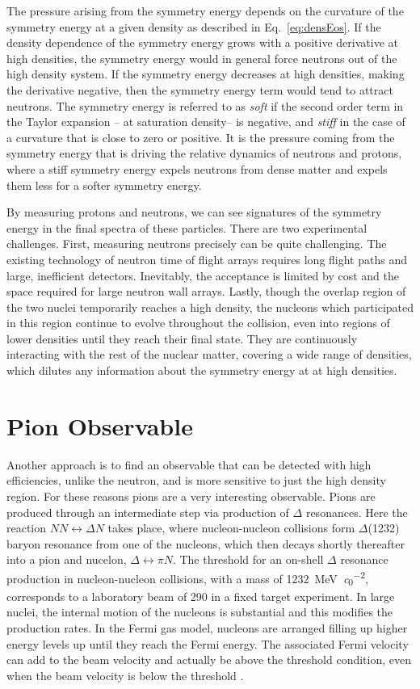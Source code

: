The pressure arising from the symmetry energy depends on the curvature of the symmetry energy at a given density as described in Eq.~\ref{eq:densEos}. If the density dependence of the symmetry energy grows with a positive derivative at high densities, the symmetry energy would in general force neutrons out of the high density system. If the symmetry energy decreases at high densities, making the derivative  negative, then the symmetry energy term would tend to attract neutrons. The symmetry energy is referred to as \emph{soft} if the second order term in the Taylor expansion -- at saturation density-- is negative, and \emph{stiff} in the case of a curvature that is close to zero or positive. It is the pressure coming from the symmetry energy that is driving the relative dynamics of neutrons and protons, where a stiff symmetry energy expels neutrons from dense matter and expels them less for a softer symmetry energy.

By measuring protons and neutrons, we can see signatures of the symmetry energy in the final spectra of these particles. There are two experimental challenges. First,  measuring neutrons precisely can be quite challenging. The existing technology of neutron time of flight arrays requires long flight paths and large, inefficient detectors. Inevitably, the acceptance is limited by cost and the space required for large neutron wall arrays. Lastly, though the overlap region of the two nuclei temporarily reaches a high density, the nucleons which participated in this region continue to evolve throughout the collision, even into regions of lower densities until they reach their final state. They are continuously interacting with the rest of the nuclear matter, covering a wide range of densities, which dilutes any information about the symmetry energy at at high densities.  




\section{Pion Observable}
\label{sec:pionObs}
Another approach is to find an observable that can be detected with high efficiencies, unlike the neutron, and is more sensitive to just the high density region. For these reasons pions are a very interesting observable. Pions are produced through an intermediate step via production of $\Delta$ resonances. Here the reaction $ NN \leftrightarrow \Delta N$ takes place, where nucleon-nucleon collisions form $\Delta$(1232) baryon resonance from one of the nucleons, which then decays shortly thereafter into a pion and nucelon, $\Delta \leftrightarrow \pi N$. The threshold for  an on-shell $\Delta$ resonance production in nucleon-nucleon collisions, with a mass of \SI{1232}{\mega\electronvolt\per\clight\squared}, corresponds to a laboratory beam of \SI{290}{\MeVA} in a fixed target experiment. In large nuclei, the internal motion of the nucleons is substantial and this modifies the production rates. In the Fermi gas model, nucleons are arranged filling up higher energy levels up until they reach the Fermi energy. The associated Fermi velocity can add to the beam velocity and actually be above the threshold condition, even when the beam velocity is below the threshold \cite{fermiEnergy}.


